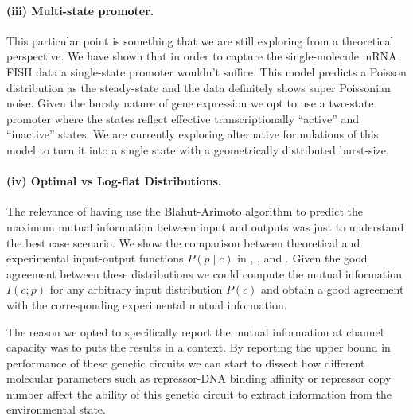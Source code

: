 \paragraph{(iii) Multi-state promoter.}
This particular point is something that we are still exploring from a
theoretical perspective. We have shown that in order to capture the
single-molecule mRNA FISH data a single-state promoter wouldn't suffice. This
model predicts a Poisson distribution as the steady-state and the data
definitely shows super Poissonian noise. Given the bursty nature of gene
expression we opt to use a two-state promoter where the states reflect
effective transcriptionally ``active'' and ``inactive'' states. We are
currently exploring alternative formulations of this model to turn it into a
single state with a geometrically distributed burst-size.

\paragraph{(iv) Optimal vs Log-flat Distributions.}
The relevance of having use the Blahut-Arimoto algorithm to predict the maximum
mutual information between input and outputs was just to understand the best
case scenario. We show the comparison between theoretical and experimental
input-output functions $P(p \mid c)$ in , ,
and . Given the good agreement between these distributions we
could compute the mutual information $I(c; p)$ for any arbitrary input
distribution $P(c)$ and obtain a good agreement with the corresponding
experimental mutual information.

The reason we opted to specifically report the mutual information at channel
capacity was to puts the results in a context. By reporting the upper bound in
performance of these genetic circuits we can start to dissect how different
molecular parameters such as repressor-DNA binding affinity or repressor copy
number affect the ability of this genetic circuit to extract information from
the environmental state.
